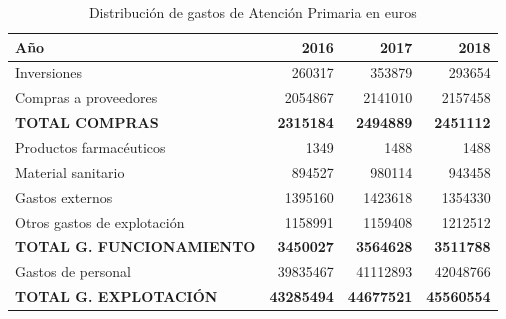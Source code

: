 \begin{table}
    \centering
    \begin{tabular}{lrrr}
        \toprule
        Año                              & 2016              & 2017              & 2018              \\
        \midrule
        Inversiones                      & 260317            & 353879            & 293654            \\
        Compras a proveedores            & 2054867           & 2141010           & 2157458           \\
        \textbf{TOTAL COMPRAS}           & \textbf{2315184}  & \textbf{2494889}  & \textbf{2451112}  \\
        \midrule
        Productos farmacéuticos          & 1349              & 1488              & 1488              \\
        Material sanitario               & 894527            & 980114            & 943458            \\
        Gastos externos                  & 1395160           & 1423618           & 1354330           \\
        Otros gastos de explotación      & 1158991           & 1159408           & 1212512           \\

        \textbf{TOTAL G. FUNCIONAMIENTO} & \textbf{3450027}  & \textbf{3564628}  & \textbf{3511788}  \\
        \midrule
        Gastos de personal               & 39835467          & 41112893          & 42048766          \\
        \textbf{TOTAL G. EXPLOTACIÓN}    & \textbf{43285494} & \textbf{44677521} & \textbf{45560554} \\
        \bottomrule
    \end{tabular}
    \caption{Distribución de gastos de Atención Primaria en euros}
    \label{tab:gastos-primaria}
\end{table}

